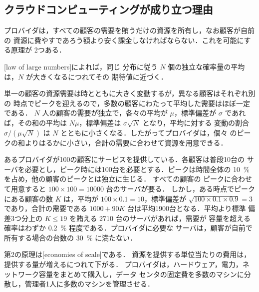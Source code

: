 \documentclass[../main.tex]{subfiles}
\begin{document}
\subsection{クラウドコンピューティングが成り立つ理由}

プロバイダは，すべての顧客の需要を賄うだけの資源を所有し，なお顧客が自前の
資源に費やすであろう額より安く課金しなければならない．これを可能にする原理が
2つある．

\begin{definition}[大数の法則]
  [law of large numbers]によれば，同じ
  分布に従う $N$ 個の独立な確率量の平均は，$N$ が大きくなるにつれてその
  期待値に近づく．
\end{definition}

単一の顧客の資源需要は時とともに大きく変動するが，異なる顧客はそれぞれ別の
時点でピークを迎えるので，多数の顧客にわたって平均した需要はほぼ一定である．
$N$ 人の顧客の需要が独立で，各々の平均が $\mu$，標準偏差が $\sigma$ であれ
ば，その和の平均は $N\mu$，標準偏差は $\sigma\sqrt{N}$ となり，平均に対する
変動の割合 $\sigma/(\mu\sqrt{N})$ は $N$ とともに小さくなる．したがってプロバイダは，個々
のピークの和よりはるかに小さい，合計の需要に合わせて資源を用意できる．

\begin{example}
  あるプロバイダが100の顧客にサービスを提供している．各顧客は普段10台の
  サーバを必要とし，ピーク時には100台を必要とする．ピークは時間全体の
  \SI{10}{\percent} を占め，他の顧客のピークとは独立に生じる．%
  すべての顧客の
  ピークに合わせて用意すると $100 \times 100 = \num{10000}$ 台のサーバが要る．
  しかし，ある時点でピークにある顧客の数 $K$ は，平均が
  $100 \times 0.1 = 10$，標準偏差が $\sqrt{100 \times 0.1 \times 0.9} = 3$
  であり，合計の需要である $1000 + 90K$ 台は平均1900台となる．平均より標準
  偏差3つ分上の $K \le 19$ を賄える \num{2710} 台のサーバがあれば，需要が
  容量を超える確率はわずか \SI{0.2}{\percent} 程度である．プロバイダに必要な
  サーバは，顧客が自前で所有する場合の台数の \SI{30}{\percent} に満たない．
\end{example}

第2の原理は[economies of scale]である．
資源を提供する単位当たりの費用は，提供する量が増えるにつれて下がる．
プロバイダは，ハードウェア，電力，ネットワーク容量をまとめて購入し，データ
センタの固定費を多数のマシンに分散し，管理者1人に多数のマシンを管理させる．
\end{document}
